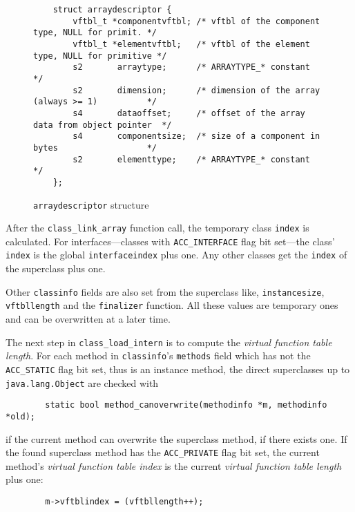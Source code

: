 \begin{figure}[h]
\begin{verbatim}
    struct arraydescriptor {
        vftbl_t *componentvftbl; /* vftbl of the component type, NULL for primit. */
        vftbl_t *elementvftbl;   /* vftbl of the element type, NULL for primitive */
        s2       arraytype;      /* ARRAYTYPE_* constant                          */
        s2       dimension;      /* dimension of the array (always >= 1)          */
        s4       dataoffset;     /* offset of the array data from object pointer  */
        s4       componentsize;  /* size of a component in bytes                  */
        s2       elementtype;    /* ARRAYTYPE_* constant                          */
    };
\end{verbatim}
\caption{\texttt{arraydescriptor} structure}
\label{arraydescriptorstructure}
\end{figure}

After the \texttt{class\_link\_array} function call, the temporary
class \texttt{index} is calculated. For interfaces---classes with
\texttt{ACC\_INTERFACE} flag bit set---the class' \texttt{index} is
the global \texttt{interfaceindex} plus one. Any other classes get the
\texttt{index} of the superclass plus one.

Other \texttt{classinfo} fields are also set from the superclass like,
\texttt{instancesize}, \texttt{vftbllength} and the \texttt{finalizer}
function. All these values are temporary ones and can be overwritten
at a later time.

The next step in \texttt{class\_load\_intern} is to compute the
\textit{virtual function table length}. For each method in
\texttt{classinfo}'s \texttt{methods} field which has not the
\texttt{ACC\_STATIC} flag bit set, thus is an instance method, the
direct superclasses up to \texttt{java.lang.Object} are checked with

\begin{verbatim}
        static bool method_canoverwrite(methodinfo *m, methodinfo *old);
\end{verbatim}

if the current method can overwrite the superclass method, if there
exists one. If the found superclass method has the
\texttt{ACC\_PRIVATE} flag bit set, the current method's
\textit{virtual function table index} is the current \textit{virtual
function table length} plus one:

\begin{verbatim}
        m->vftblindex = (vftbllength++);
\end{verbatim}

